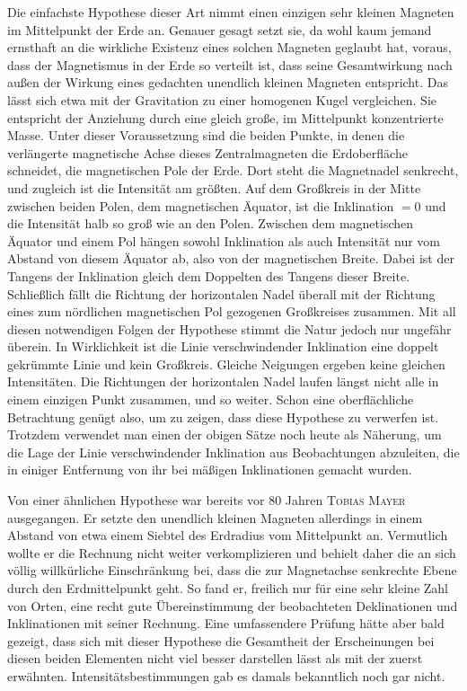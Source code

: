Die einfachste Hypothese dieser Art nimmt einen einzigen sehr kleinen Magneten im Mittelpunkt der Erde an. Genauer gesagt setzt sie, da wohl kaum jemand ernsthaft an die wirkliche Existenz eines solchen Magneten geglaubt hat, voraus, dass der Magnetismus in der Erde so verteilt ist, dass seine Gesamtwirkung nach außen der Wirkung eines gedachten unendlich kleinen Magneten entspricht. Das lässt sich etwa mit der Gravitation zu einer homogenen Kugel vergleichen. Sie entspricht der Anziehung durch eine gleich große, im Mittelpunkt konzentrierte Masse. Unter dieser Voraussetzung sind die beiden Punkte, in denen die verlängerte magnetische Achse dieses Zentralmagneten die Erdoberfläche schneidet, die magnetischen Pole der Erde. Dort steht die Magnetnadel senkrecht, und zugleich ist die Intensität am größten. Auf dem Großkreis in der Mitte zwischen beiden Polen, dem magnetischen Äquator, ist die Inklination $=0$ und die Intensität halb so groß wie an den Polen. Zwischen dem magnetischen Äquator und einem Pol hängen sowohl Inklination als auch Intensität nur vom Abstand von diesem Äquator ab, also von der magnetischen Breite. Dabei ist der Tangens der Inklination gleich dem Doppelten des Tangens dieser Breite. Schließlich fällt die Richtung der horizontalen Nadel überall mit der Richtung eines zum nördlichen magnetischen Pol gezogenen Großkreises zusammen. Mit all diesen notwendigen Folgen der Hypothese stimmt die Natur jedoch nur ungefähr überein. In Wirklichkeit ist die Linie verschwindender Inklination eine doppelt gekrümmte Linie und kein Großkreis. Gleiche Neigungen ergeben keine gleichen Intensitäten. Die Richtungen der horizontalen Nadel laufen längst nicht alle in einem einzigen Punkt zusammen, und so weiter. Schon eine oberflächliche Betrachtung genügt also, um zu zeigen, dass diese Hypothese zu verwerfen ist. Trotzdem verwendet man einen der obigen Sätze noch heute als Näherung, um die Lage der Linie verschwindender Inklination aus Beobachtungen abzuleiten, die in einiger Entfernung von ihr bei mäßigen Inklinationen gemacht wurden.

Von einer ähnlichen Hypothese war bereits vor 80 Jahren \textsc{Tobias Mayer} ausgegangen. Er setzte den unendlich kleinen Magneten allerdings in einem Abstand von etwa einem Siebtel des Erdradius vom Mittelpunkt an. Vermutlich wollte er die Rechnung nicht weiter verkomplizieren und behielt daher die an sich völlig willkürliche Einschränkung bei, dass die zur Magnetachse senkrechte Ebene durch den Erdmittelpunkt geht. So fand er, freilich nur für eine sehr kleine Zahl von Orten, eine recht gute Übereinstimmung der beobachteten Deklinationen und Inklinationen mit seiner Rechnung. Eine umfassendere Prüfung hätte aber bald gezeigt, dass sich mit dieser Hypothese die Gesamtheit der Erscheinungen bei diesen beiden Elementen nicht viel besser darstellen lässt als mit der zuerst erwähnten. Intensitätsbestimmungen gab es damals bekanntlich noch gar nicht.

